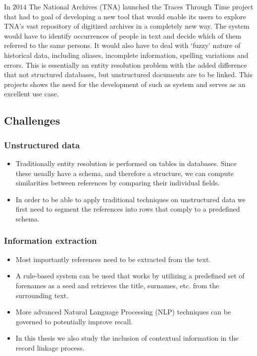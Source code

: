 \documentclass[paper=a4, fontsize=11pt]{scrartcl}					%
\numberwithin{equation}{section}					%
\numberwithin{figure}{section}						%
\numberwithin{table}{section}						%
\begin{document}
In $2014$ The National Archives (TNA) launched the Traces Through Time project that had to goal of developing a new tool that would enable its users to explore TNA's vast repository of digitized archives in a completely new way. The system would have to identify occurrences of people in text and decide which of them referred to the same persons. It would also have to deal with `fuzzy' nature of historical data, including aliases, incomplete information, spelling variations and errors. This is essentially an entity resolution problem with the added difference that not structured databases, but unstructured documents are to be linked. This projects shows the need for the development of such as system and serves as an excellent use case.

\subsection{Challenges}
\subsubsection{Unstructured data}
\begin{itemize}
	\item Traditionally entity resolution is performed on tables in databases. Since these usually have a schema, and therefore a structure, we can compute similarities between references by comparing their individual fields.
	\item In order to be able to apply traditional techniques on unstructured data we first need to segment the references into rows that comply to a predefined schema.
\end{itemize}

\subsubsection{Information extraction}
\begin{itemize}
	\item Most importantly references need to be extracted from the text.
	\item A rule-based system can be used that works by utilizing a predefined set of forenames as a seed and retrieves the title, surnames, etc. from the surrounding text.
	\item More advanced Natural Language Processing (NLP) techniques can be governed to potentially improve recall.
	\item In this thesis we also study the inclusion of contextual information in the record linkage process.
\end{itemize}
\end{document}
